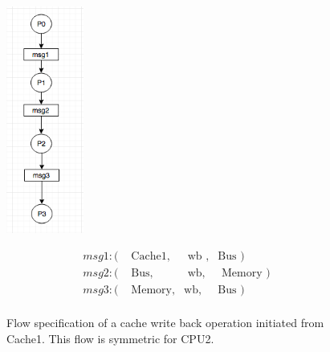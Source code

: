 \documentclass[12pt,frontmatter,copyright,thesis]{usfmanus}
\begin{document}
\begin{appendix}
 \begin{figure}[h]
 \centerline{
 \includegraphics[width=1in]{wbprotocol}}
 {\footnotesize
 \[
 \begin{array}{llll}
 msg1: (&\mbox{ Cache1},&\mbox{ wb },&\mbox{Bus })\\     
 msg2: (&\mbox{ Bus},&\mbox{ wb},&\mbox{ Memory     })\\ 
 msg3: (&\mbox{ Memory},&\mbox{wb},&\mbox{Bus     })\\
 \end{array}
 \]}

  \caption{\footnotesize Flow specification of a cache write back operation initiated from Cache1. \footnotesize This flow is symmetric for CPU2. }
 \label{wbprotocol}
 \end{figure}


\end{appendix}
\end{document}
